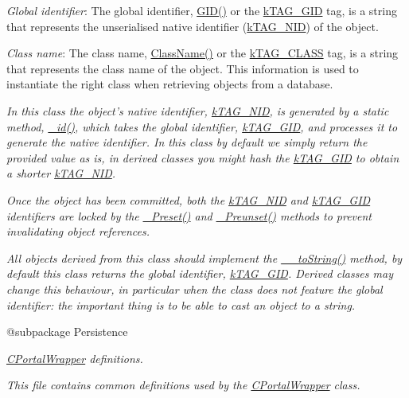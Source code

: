 {\itshape 
\begin{DoxyItemize}
\item {\itshape Global identifier}\-: The global identifier, {\ttfamily \hyperlink{}{G\-I\-D()}} or the {\ttfamily \hyperlink{}{k\-T\-A\-G\-\_\-\-G\-I\-D}} tag, is a string that represents the unserialised native identifier (\hyperlink{}{k\-T\-A\-G\-\_\-\-N\-I\-D}) of the object. 
\item {\itshape Class name}\-: The class name, {\ttfamily \hyperlink{}{Class\-Name()}} or the {\ttfamily \hyperlink{}{k\-T\-A\-G\-\_\-\-C\-L\-A\-S\-S}} tag, is a string that represents the class name of the object. This information is used to instantiate the right class when retrieving objects from a database. 
\end{DoxyItemize}}

{\itshape In this class the object's native identifier, \hyperlink{}{k\-T\-A\-G\-\_\-\-N\-I\-D}, is generated by a static method, \hyperlink{}{\-\_\-id()}, which takes the global identifier, \hyperlink{}{k\-T\-A\-G\-\_\-\-G\-I\-D}, and processes it to generate the native identifier. In this class by default we simply return the provided value as is, in derived classes you might hash the \hyperlink{}{k\-T\-A\-G\-\_\-\-G\-I\-D} to obtain a shorter \hyperlink{}{k\-T\-A\-G\-\_\-\-N\-I\-D}.}

{\itshape Once the object has been committed, both the \hyperlink{}{k\-T\-A\-G\-\_\-\-N\-I\-D} and \hyperlink{}{k\-T\-A\-G\-\_\-\-G\-I\-D} identifiers are locked by the \hyperlink{}{\-\_\-\-Preset()} and \hyperlink{}{\-\_\-\-Preunset()} methods to prevent invalidating object references.}

{\itshape All objects derived from this class should implement the \hyperlink{}{\-\_\-\-\_\-to\-String()} method, by default this class returns the global identifier, \hyperlink{}{k\-T\-A\-G\-\_\-\-G\-I\-D}. Derived classes may change this behaviour, in particular when the class does not feature the global identifier\-: the important thing is to be able to cast an object to a string.}

{\itshape \begin{DoxyVerb} @subpackage        Persistence\end{DoxyVerb}
}

{\itshape \hyperlink{class_c_portal_wrapper}{C\-Portal\-Wrapper} definitions.}

{\itshape This file contains common definitions used by the \hyperlink{class_c_portal_wrapper}{C\-Portal\-Wrapper} class.}

